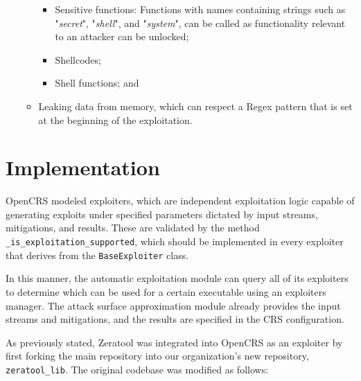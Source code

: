 \documentclass[../main.tex]{subfiles}
\begin{document}
\begin{enumerate}
\begin{itemize}
                \begin{itemize}
                  \tightlist
                  \item
                        Sensitive functions: Functions with names containing strings such
                        as "\emph{secret}", "\emph{shell}", and "\emph{system}", can
                        be called as functionality relevant to an attacker can be
                        unlocked;
                  \item
                        Shellcodes;
                  \item
                        Shell functions; and
                \end{itemize}
          \item
                Leaking data from memory, which can respect a Regex pattern that is
                set at the beginning of the exploitation.
        \end{itemize}
\end{enumerate}

\hypertarget{implementation}{%
  \section{Implementation}\label{implementation}}

OpenCRS modeled exploiters, which are independent exploitation logic capable of
generating exploits under specified parameters dictated by input streams,
mitigations, and results. These are validated by the method
\texttt{\_is\_exploitation\_supported}, which should be implemented in every
exploiter that derives from the \texttt{BaseExploiter} class.

In this manner, the automatic exploitation module can query all of its
exploiters to determine which can be used for a certain executable using an
exploiters manager. The attack surface approximation module already provides
the input streams and mitigations, and the results are specified in the CRS
configuration.

As previously stated, Zeratool was integrated into OpenCRS as an exploiter by
first forking the main repository \cite{zeratool_lib} into our organization's new
repository, \texttt{zeratool\_lib}. The original codebase was modified as
follows:
\end{document}
